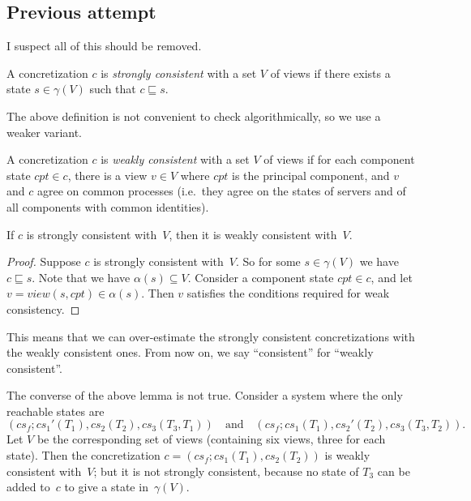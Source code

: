 
\subsection{Previous attempt}

I suspect all of this should be removed.


%
\begin{definition}
A concretization $c$ is \emph{strongly consistent} with a set $V$ of views if
there exists a  state $s \in \gamma(V)$ such that $c \sqsubseteq s$.
\end{definition}
%
The above definition is not convenient to check algorithmically, so we use a
weaker variant.
%
\begin{definition}
A concretization $c$ is \emph{weakly consistent} with a set $V$ of views if
for each component state $cpt \in c$, there is a view $v \in V$ where $cpt$ is
the principal component, and $v$ and $c$ agree on common processes (i.e.~they
agree on the states of servers and of all components with common identities).
\end{definition}
%
\begin{lemma}
If $c$ is strongly consistent with~$V$, then it is weakly consistent with~$V$.
\end{lemma}
%
\begin{proof}
Suppose $c$ is strongly consistent with~$V$.  So for some $s \in \gamma(V)$ we
have $c \sqsubseteq s$.  Note that we have $\alpha(s) \subseteq V$.  Consider
a component state $cpt \in c$, and let $v = view(s, cpt) \in \alpha(s)$.  Then
$v$ satisfies the conditions required for weak consistency.
\end{proof}
%
This means that we can over-estimate the strongly consistent concretizations
with the weakly consistent ones.  From now on, we say ``consistent'' for
``weakly consistent''.  

The converse of the above lemma is not true.  Consider a system where the only
reachable states are
\[
(cs_f; cs_1'(T_1), cs_2(T_2), cs_3(T_3,T_1)) \quad\mbox{and}\quad
(cs_f; cs_1(T_1), cs_2'(T_2), cs_3(T_3,T_2)).
\]
Let $V$ be the corresponding set of views (containing six views, three for
each state).  Then the concretization
$c = (cs_f; cs_1(T_1), cs_2(T_2))$ is weakly consistent with~$V$;
but it is not strongly consistent, because no state of $T_3$ can be added
to~$c$ to give a state in~$\gamma(V)$.

